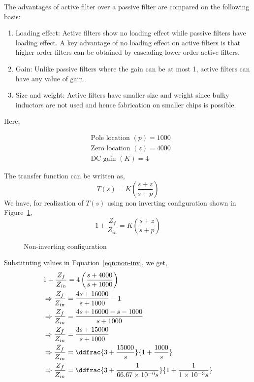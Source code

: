 The advantages of active filter over a passive filter are compared on the following basis:
\begin{enumerate}
    \item Loading effect: Active filters show no loading effect while passive filters have loading effect. A key advantage of no loading effect on active filters is that higher order filters can be obtained by cascading lower order active filters.
    \item Gain: Unlike passive filters where the gain can be at most 1, active filters can have any value of gain.
    \item Size and weight: Active filters have smaller size and weight since bulky inductors are not used and hence fabrication on smaller chips is possible.
\end{enumerate}
Here,
\begin{fleqn}[\parindent]
   \begin{equation*}
      \begin{split}
         &\text{Pole location } (p)=1000\\
         &\text{Zero location } (z)=4000\\
         &\text{DC gain } (K)=4
         \end{split}
      \end{equation*}
\end{fleqn}
The transfer function can be written as,
\begin{equation*}
    T(s)=K\left(\frac{s+z}{s+p}\right)
\end{equation*}
We have, for realization of $T(s)$ using non inverting configuration shown in Figure~\ref{fig:non-inv},
\begin{equation}
    1+\frac{Z_{f}}{Z_{in}}=K\left(\frac{s+z}{s+p}\right)
    \label{eqn:non-inv}
\end{equation}
\begin{figure}[H]
    \centering
    \fignoninverting
    \caption{Non-inverting configuration}
    \label{fig:non-inv}
\end{figure}
Substituting values in Equation~\ref{eqn:non-inv}, we get,
\begin{equation*}
    \begin{aligned}
        &1+\frac{Z_f}{Z_{in}}=4\left(\frac{s+4000}{s+1000}\right)\\
        &\Rightarrow\frac{Z_f}{Z_{in}}=\frac{4s+16000}{s+1000}-1\\
        &\Rightarrow\frac{Z_f}{Z_{in}}=\frac{4s+16000-s-1000}{s+1000}\\
        &\Rightarrow\frac{Z_f}{Z_{in}}=\frac{3s+15000}{s+1000}\\
        &\Rightarrow\frac{Z_f}{Z_{in}}=\ddfrac{3+\frac{15000}{s}}{1+\frac{1000}{s}}\\
        &\Rightarrow\frac{Z_f}{Z_{in}}=\ddfrac{3+\frac{1}{66.67\times10^{-6}s}}{1+\frac{1}{1\times10^{-3}s}}\\
    \end{aligned}
\end{equation*}
